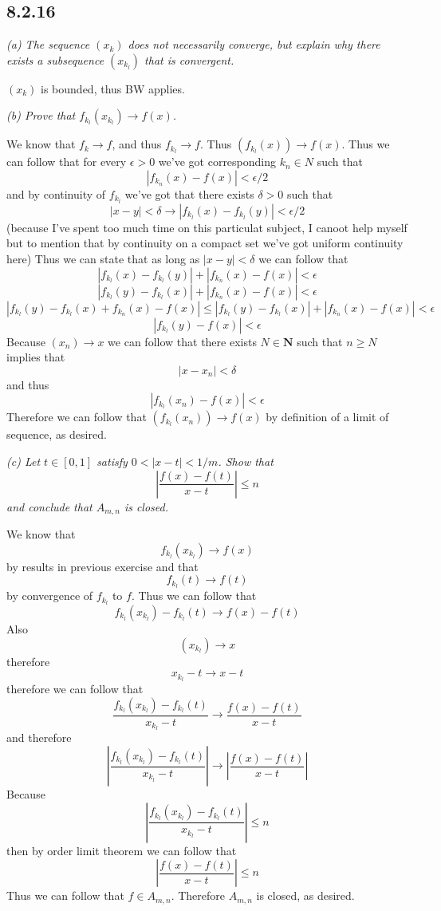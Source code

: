 \documentclass[11pt,oneside,titlepage]{book}
\begin{document}
\subsection*{8.2.16}
\textit{(a) The sequence $(x_k)$ does not necessarily converge, but explain why there
  exists a subsequence $(x_{k_l})$ that is convergent.}

$(x_k)$ is bounded, thus BW applies.

\textit{(b) Prove that $f_{k_l}(x_{k_l}) \to f(x)$.}

We know that $f_k \to f$, and thus $f_{k_l} \to f$. Thus $(f_{k_l}(x)) \to f(x)$.
Thus we can follow that for every $\epsilon > 0$ we've got corresponding $k_n \in N$ such that
$$|f_{k_n}(x) - f(x)| < \epsilon/2$$
and by continuity of $f_{k_l}$ we've got that there exists
$\delta > 0$ such that
$$|x - y| < \delta \to |f_{k_l}(x) - f_{k_l}(y)| < \epsilon/2$$
(because I've spent too much time on this particulat subject, I canoot help
myself but to  mention that
by continuity on a compact set we've got uniform continuity here)
Thus we can state that as long as $|x - y| < \delta$ we can follow that
$$|f_{k_l}(x) - f_{k_l}(y)| + |f_{k_n}(x) - f(x)| < \epsilon$$
$$|f_{k_l}(y) - f_{k_l}(x)| + |f_{k_n}(x) - f(x)| < \epsilon$$
$$ |f_{k_l}(y) - f_{k_l}(x) + f_{k_n}(x) - f(x)|
\leq |f_{k_l}(y) - f_{k_l}(x)| + |f_{k_n}(x) - f(x)| < \epsilon$$
$$ |f_{k_l}(y)  - f(x)| < \epsilon$$
Because $(x_n) \to x$ we can follow that there exists $N \in \textbf{N}$ such that
$n \geq N$ implies that
$$|x - x_n| < \delta$$
and thus
$$ |f_{k_l}(x_n)  - f(x)| < \epsilon$$
Therefore we can follow that $(f_{k_l}(x_n)) \to f(x)$ by definition of a limit of sequence,
as desired.

\textit{(c) Let $t \in [0, 1]$ satisfy $0 < |x - t| < 1/m$. Show that}
$$\left|\frac{f(x) - f(t)}{x - t}\right| \leq n$$
\textit{and conclude that $A_{m,n}$ is closed.}

We know that
$$f_{k_l}(x_{k_l}) \to f(x)$$
by results in previous exercise and that 
$$f_{k_l}(t) \to f(t)$$
by convergence of $f_{k_l}$ to $f$.
Thus we can follow that
$$f_{k_l}(x_{k_l}) - f_{k_l}(t) \to f(x) - f(t)$$
Also 
$$(x_{k_l}) \to x$$
therefore 
$$x_{k_l} - t \to x - t$$
therefore we can follow that
$$\frac{f_{k_l}(x_{k_l}) - f_{k_l}(t)}{x_{k_l} - t} \to \frac{f(x) - f(t)}{x - t}$$
and therefore
$$\left|\frac{f_{k_l}(x_{k_l}) - f_{k_l}(t)}{x_{k_l} - t}\right| \to
\left|\frac{f(x) - f(t)}{x - t}\right|$$
Because
$$\left|\frac{f_{k_l}(x_{k_l}) - f_{k_l}(t)}{x_{k_l} - t}\right| \leq n$$
then by order limit theorem we can follow that
$$\left|\frac{f(x) - f(t)}{x - t}\right| \leq n$$
Thus we can follow that $f \in A_{m, n}$. Therefore $A_{m, n}$ is closed, as desired.
\end{document}

